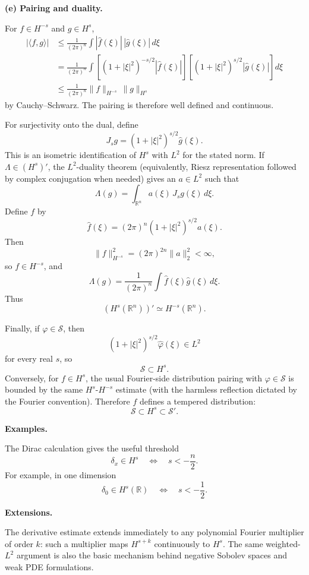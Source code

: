 \begin{solution}
\smallskip
\noindent\textbf{(e) Pairing and duality.}

For \(f\in H^{-s}\) and \(g\in H^s\),
\[
\begin{aligned}
|\langle f,g\rangle|
&\le
\frac1{(2\pi)^n}
\int
|\widehat f(\xi)|\,|\widehat g(\xi)|\,d\xi\\
&=
\frac1{(2\pi)^n}
\int
\left[
(1+|\xi|^2)^{-s/2}|\widehat f(\xi)|
\right]
\left[
(1+|\xi|^2)^{s/2}|\widehat g(\xi)|
\right]d\xi\\
&\le
\frac1{(2\pi)^n}
\|f\|_{H^{-s}}\,
\|g\|_{H^s}
\end{aligned}
\]
by Cauchy--Schwarz. The pairing is therefore well defined and continuous.

For surjectivity onto the dual, define
\[
J_sg
=
(1+|\xi|^2)^{s/2}\widehat g(\xi).
\]
This is an isometric identification of \(H^s\) with \(L^2\) for the
stated norm. If \(\Lambda\in(H^s)'\), the \(L^2\)-duality theorem
(equivalently, Riesz representation followed by complex conjugation when
needed) gives an \(a\in L^2\) such that
\[
\Lambda(g)
=
\int_{\mathbb R^n}
a(\xi)\,J_sg(\xi)\,d\xi.
\]
Define \(f\) by
\[
\widehat f(\xi)
=
(2\pi)^n
(1+|\xi|^2)^{s/2}a(\xi).
\]
Then
\[
\|f\|_{H^{-s}}^2
=
(2\pi)^{2n}\|a\|_2^2<\infty,
\]
so \(f\in H^{-s}\), and
\[
\Lambda(g)
=
\frac1{(2\pi)^n}
\int
\widehat f(\xi)\widehat g(\xi)\,d\xi.
\]
Thus
\[
\boxed{
(H^s(\mathbb R^n))'
\simeq
H^{-s}(\mathbb R^n).}
\]

Finally, if \(\varphi\in\mathcal S\), then
\[
(1+|\xi|^2)^{s/2}\widehat\varphi(\xi)\in L^2
\]
for every real \(s\), so
\[
\mathcal S\subset H^s.
\]
Conversely, for \(f\in H^s\), the usual Fourier-side distribution
pairing with \(\varphi\in\mathcal S\) is bounded by the same
\(H^s\)-\(H^{-s}\) estimate (with the harmless reflection dictated by
the Fourier convention). Therefore \(f\) defines a tempered distribution:
\[
\boxed{
\mathcal S
\subset
H^s
\subset
\mathcal S'.}
\]

\medskip
\noindent\textbf{Examples.}

The Dirac calculation gives the useful threshold
\[
\delta_x\in H^s
\quad\Longleftrightarrow\quad
s<-\frac n2.
\]
For example, in one dimension
\[
\delta_0\in H^s(\mathbb R)
\quad\Longleftrightarrow\quad
s<-\frac12.
\]

\medskip
\noindent\textbf{Extensions.}

The derivative estimate extends immediately to any polynomial Fourier
multiplier of order \(k\): such a multiplier maps \(H^{s+k}\) continuously
to \(H^s\). The same weighted-\(L^2\) argument is also the basic mechanism
behind negative Sobolev spaces and weak PDE formulations.
\end{solution}

